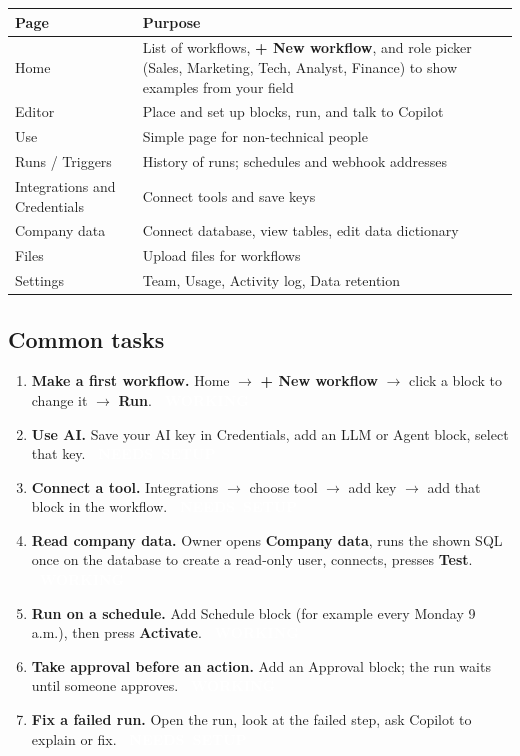 \documentclass[11pt,a4paper]{article}
\newcommand{\sWork}{\colorbox{okc}{\textcolor{white}{\scriptsize\bfseries\ WORKING\ }}}
\newcommand{\sSetup}{\colorbox{setupc}{\textcolor{white}{\scriptsize\bfseries\ NEEDS\ SETUP\ }}}
\begin{document}
\begin{longtable}{@{}L{4.6cm}L{11cm}@{}}
\toprule
\textbf{Page} & \textbf{Purpose} \\
\midrule
\endhead
Home & List of workflows, \textbf{+ New workflow}, and role picker (Sales, Marketing, Tech, Analyst, Finance) to show examples from your field \\
Editor & Place and set up blocks, run, and talk to Copilot \\
Use & Simple page for non-technical people \\
Runs / Triggers & History of runs; schedules and webhook addresses \\
Integrations and Credentials & Connect tools and save keys \\
Company data & Connect database, view tables, edit data dictionary \\
Files & Upload files for workflows \\
Settings & Team, Usage, Activity log, Data retention \\
\bottomrule
\end{longtable}

\subsection{Common tasks}

\begin{enumerate}
  \item \textbf{Make a first workflow.} Home $\rightarrow$ \textbf{+ New workflow} $\rightarrow$ click a block to change it $\rightarrow$ \textbf{Run}. \sWork
  \item \textbf{Use AI.} Save your AI key in Credentials, add an LLM or Agent block, select that key. \sSetup
  \item \textbf{Connect a tool.} Integrations $\rightarrow$ choose tool $\rightarrow$ add key $\rightarrow$ add that block in the workflow. \sSetup
  \item \textbf{Read company data.} Owner opens \textbf{Company data}, runs the shown SQL once on the database to create a read-only user, connects, presses \textbf{Test}. \sWork
  \item \textbf{Run on a schedule.} Add Schedule block (for example every Monday 9 a.m.), then press \textbf{Activate}. \sWork
  \item \textbf{Take approval before an action.} Add an Approval block; the run waits until someone approves. \sWork
  \item \textbf{Fix a failed run.} Open the run, look at the failed step, ask Copilot to explain or fix. \sSetup
\end{enumerate}
\end{document}
